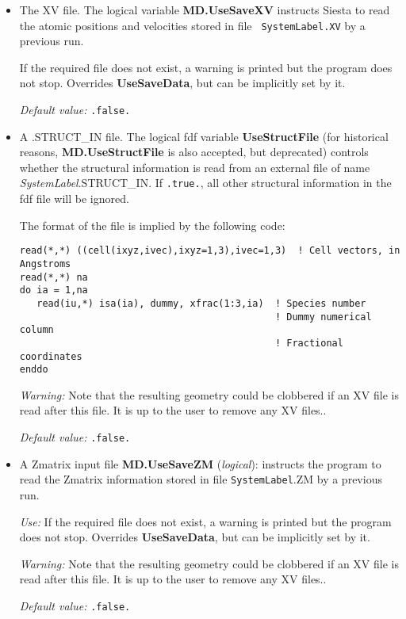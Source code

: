 \documentclass[11pt]{article}
\begin{document}
\begin{itemize}

\item The XV file.
 
The logical variable {\bf MD.UseSaveXV} instructs {\sc Siesta} to
read the atomic positions and velocities stored in file {\tt
SystemLabel.XV} by a previous run.

If the required file does not exist, a warning is printed but the
program does not stop. Overrides {\bf UseSaveData}, but can be
implicitly set by it.

{\it Default value:} {\tt .false.}

\item A .STRUCT\_IN file. The logical fdf variable {\bf UseStructFile}
  (for historical reasons, {\bf MD.UseStructFile} is also accepted,
  but deprecated)
  controls whether the structural information is read from an external
  file of name {\it SystemLabel}.STRUCT\_IN.  If \texttt{.true.}, all
  other structural information in the fdf file will be
  ignored.

The format of the file is implied by the following code:

\begin{verbatim}
read(*,*) ((cell(ixyz,ivec),ixyz=1,3),ivec=1,3)  ! Cell vectors, in Angstroms
read(*,*) na
do ia = 1,na
   read(iu,*) isa(ia), dummy, xfrac(1:3,ia)  ! Species number
                                             ! Dummy numerical column
                                             ! Fractional coordinates
enddo
\end{verbatim}

{\it Warning:} Note that the resulting geometry could be clobbered if
an XV file is read after this file. It is up to the user to remove
any XV files..

{\it Default value:} {\tt .false.}


\item A Zmatrix input file
{\bf MD.UseSaveZM} ({\it logical}):
instructs the program to read the Zmatrix information stored
in file {\tt SystemLabel}.ZM by a previous run.

{\it Use:} If the required file does not exist, a warning is
printed but the program does not stop. Overrides {\bf UseSaveData},
but can be implicitly set by it.

{\it Warning:} Note that the resulting geometry could be clobbered if
an XV file is read after this file. It is up to the user to remove
any XV files..

{\it Default value:} {\tt .false.}
\end{itemize}
\end{document}
